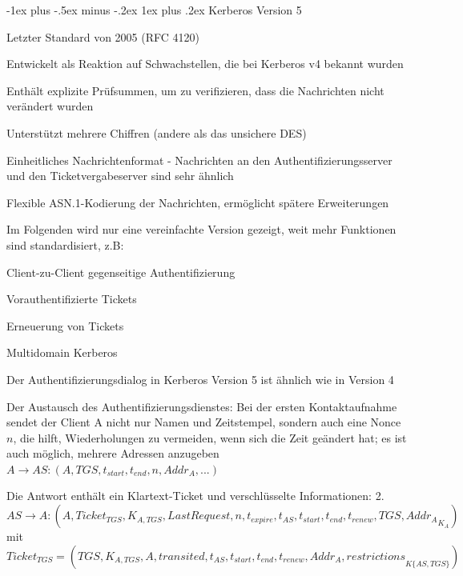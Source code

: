 \documentclass[a4paper]{article}
\makeatletter
\renewcommand{\subsubsection}{\@startsection{subsubsection}{3}{0mm}%
 {-1ex plus -.5ex minus -.2ex}%
 {1ex plus .2ex}%
 {\normalfont\small\bfseries}}
\makeatother
\begin{document}
\begin{multicols}{3}
      \subsubsection{Kerberos Version 5}
      \begin{itemize*}
            \item Letzter Standard von 2005 (RFC 4120)
            \item Entwickelt als Reaktion auf Schwachstellen, die bei Kerberos v4 bekannt wurden
            \item Enthält explizite Prüfsummen, um zu verifizieren, dass die Nachrichten nicht verändert wurden
            \item Unterstützt mehrere Chiffren (andere als das unsichere DES)
            \item Einheitliches Nachrichtenformat - Nachrichten an den Authentifizierungsserver und den Ticketvergabeserver sind sehr ähnlich
            \item Flexible ASN.1-Kodierung der Nachrichten, ermöglicht spätere Erweiterungen
            \item Im Folgenden wird nur eine vereinfachte Version gezeigt, weit mehr Funktionen sind standardisiert, z.B:
            \begin{itemize*}
                  \item Client-zu-Client gegenseitige Authentifizierung
                  \item Vorauthentifizierte Tickets
                  \item Erneuerung von Tickets
                  \item Multidomain Kerberos
            \end{itemize*}
            \item Der Authentifizierungsdialog in Kerberos Version 5 ist ähnlich wie in Version 4
            \item Der Austausch des Authentifizierungsdienstes: Bei der ersten Kontaktaufnahme sendet der Client A nicht nur Namen und Zeitstempel, sondern auch eine Nonce $n$, die hilft, Wiederholungen zu vermeiden, wenn sich die Zeit geändert hat; es ist auch möglich, mehrere Adressen anzugeben $A\rightarrow AS:(A,TGS,t_{start},t_{end},n,Addr_A, ...)$
            \item Die Antwort enthält ein Klartext-Ticket und verschlüsselte Informationen: 2. $AS\rightarrow A: (A,Ticket_{TGS},{K_{A,TGS}, LastRequest,n,t_{expire},t_{AS},t_{start},t_{end},t_{renew},TGS, Addr_A}_{K_A})$ mit $Ticket_{TGS}=(TGS, {K_{A,TGS},A,transited, t_{AS}, t_{start},t_{end},t_{renew},Addr_A,restrictions}_{K\{AS,TGS\}})$

\end{itemize*}
\end{multicols}
\end{document}
